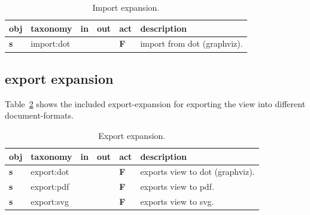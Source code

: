 \documentclass[a4paper, 12pt, openany]{scrbook}
\begin{document}
\begin{table}[htbp]
\centering
\begin{tabular}{|p{1cm}|p{3cm}|p{1.5cm}|p{1.5cm}|p{1cm}|p{7cm}|}
  \hline
  \textbf{obj} & \textbf{taxonomy} & \textbf{in} & \textbf{out} & \textbf{act} & \textbf{description} \\
  \hline
  \textbf{s} & import:dot &  &  & \textbf{F} & import from dot (graphviz). \\
  \hline
\end{tabular}
\caption{Import expansion.}
\label{tab:import-expansion}
\end{table}
\subsection{export expansion}
Table~\ref{tab:export-expansion} shows the included export-expansion for exporting the view into different document-formats.
\begin{table}[htbp]
\centering
\begin{tabular}{|p{1cm}|p{3cm}|p{1.5cm}|p{1.5cm}|p{1cm}|p{7cm}|}
  \hline
  \textbf{obj} & \textbf{taxonomy} & \textbf{in} & \textbf{out} & \textbf{act} & \textbf{description} \\
  \hline
  \textbf{s} & export:dot & & & \textbf{F} & exports view to dot (graphviz). \\
  \hline
  \textbf{s} & export:pdf & & & \textbf{F} & exports view to pdf. \\
  \hline
  \textbf{s} & export:svg & & & \textbf{F} & exports view to svg. \\
  \hline
\end{tabular}
\caption{Export expansion.}
\label{tab:export-expansion}
\end{table}
\end{document}
